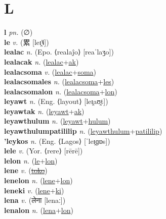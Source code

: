 \section{L}

\textbf{l} \textit{pn.} (∅)
 \label{l} \\
\textbf{le} \textit{v.} ({\chinese{}累} [leɪ̯˥˩])
 \label{le} \\
\textbf{lealac} \textit{n.} (Epo. ⟨realaĵo⟩ [reaˈlaʒo])
 \label{lealac} \\
\textbf{lealacak} \textit{n.} (\hyperref[lealac]{lealac}+\hyperref[ak]{ak})
 \label{lealacak} \\
\textbf{lealacsoma} \textit{v.} (\hyperref[lealac]{lealac}+\hyperref[soma]{soma})
 \label{lealacsoma} \\
\textbf{lealacsomales} \textit{n.} (\hyperref[lealacsoma]{lealacsoma}+\hyperref[les]{les})
 \label{lealacsomales} \\
\textbf{lealacsomalon} \textit{n.} (\hyperref[lealacsoma]{lealacsoma}+\hyperref[lon]{lon})
 \label{lealacsomalon} \\
\textbf{leyawt} \textit{n.} (Eng. ⟨layout⟩ [leɪ̯aʊ̯t])
 \label{leyawt} \\
\textbf{leyawtak} \textit{n.} (\hyperref[leyawt]{leyawt}+\hyperref[ak]{ak})
 \label{leyawtak} \\
\textbf{leyawthulum} \textit{n.} (\hyperref[leyawt]{leyawt}+\hyperref[hulum]{hulum})
 \label{leyawthulum} \\
\textbf{leyawthulumpatililip} \textit{n.} (\hyperref[leyawthulum]{leyawthulum}+\hyperref[patililip]{patililip})
 \label{leyawthulumpatililip} \\
\textbf{'leykos} \textit{n.} (Eng. ⟨Lagos⟩ [ˈleɪ̯ɡɒs])
 \label{'leykos} \\
\textbf{lele} \textit{v.} (Yor. ⟨rere⟩ [rērē])
 \label{lele} \\
\textbf{lelon} \textit{n.} (\hyperref[le]{le}+\hyperref[lon]{lon})
 \label{lelon} \\
\textbf{lene} \textit{v.} (\hyperref[toko]{\sout{toko}})
 \label{lene} \\
\textbf{lenelon} \textit{n.} (\hyperref[lene]{lene}+\hyperref[lon]{lon})
 \label{lenelon} \\
\textbf{leneki} \textit{v.} (\hyperref[lene]{lene}+\hyperref[ki]{ki})
 \label{leneki} \\
\textbf{lena} \textit{v.} ({\devanagari{}लेना} [lenaː])
 \label{lena} \\
\textbf{lenalon} \textit{n.} (\hyperref[lena]{lena}+\hyperref[lon]{lon})
